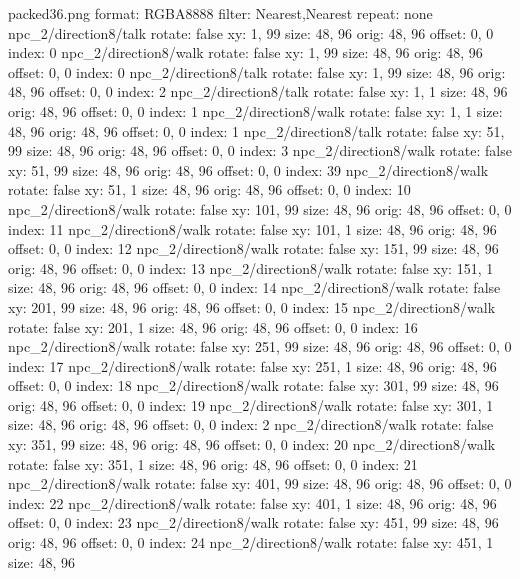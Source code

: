 packed36.png
format: RGBA8888
filter: Nearest,Nearest
repeat: none
npc_2/direction8/talk
  rotate: false
  xy: 1, 99
  size: 48, 96
  orig: 48, 96
  offset: 0, 0
  index: 0
npc_2/direction8/walk
  rotate: false
  xy: 1, 99
  size: 48, 96
  orig: 48, 96
  offset: 0, 0
  index: 0
npc_2/direction8/talk
  rotate: false
  xy: 1, 99
  size: 48, 96
  orig: 48, 96
  offset: 0, 0
  index: 2
npc_2/direction8/talk
  rotate: false
  xy: 1, 1
  size: 48, 96
  orig: 48, 96
  offset: 0, 0
  index: 1
npc_2/direction8/walk
  rotate: false
  xy: 1, 1
  size: 48, 96
  orig: 48, 96
  offset: 0, 0
  index: 1
npc_2/direction8/talk
  rotate: false
  xy: 51, 99
  size: 48, 96
  orig: 48, 96
  offset: 0, 0
  index: 3
npc_2/direction8/walk
  rotate: false
  xy: 51, 99
  size: 48, 96
  orig: 48, 96
  offset: 0, 0
  index: 39
npc_2/direction8/walk
  rotate: false
  xy: 51, 1
  size: 48, 96
  orig: 48, 96
  offset: 0, 0
  index: 10
npc_2/direction8/walk
  rotate: false
  xy: 101, 99
  size: 48, 96
  orig: 48, 96
  offset: 0, 0
  index: 11
npc_2/direction8/walk
  rotate: false
  xy: 101, 1
  size: 48, 96
  orig: 48, 96
  offset: 0, 0
  index: 12
npc_2/direction8/walk
  rotate: false
  xy: 151, 99
  size: 48, 96
  orig: 48, 96
  offset: 0, 0
  index: 13
npc_2/direction8/walk
  rotate: false
  xy: 151, 1
  size: 48, 96
  orig: 48, 96
  offset: 0, 0
  index: 14
npc_2/direction8/walk
  rotate: false
  xy: 201, 99
  size: 48, 96
  orig: 48, 96
  offset: 0, 0
  index: 15
npc_2/direction8/walk
  rotate: false
  xy: 201, 1
  size: 48, 96
  orig: 48, 96
  offset: 0, 0
  index: 16
npc_2/direction8/walk
  rotate: false
  xy: 251, 99
  size: 48, 96
  orig: 48, 96
  offset: 0, 0
  index: 17
npc_2/direction8/walk
  rotate: false
  xy: 251, 1
  size: 48, 96
  orig: 48, 96
  offset: 0, 0
  index: 18
npc_2/direction8/walk
  rotate: false
  xy: 301, 99
  size: 48, 96
  orig: 48, 96
  offset: 0, 0
  index: 19
npc_2/direction8/walk
  rotate: false
  xy: 301, 1
  size: 48, 96
  orig: 48, 96
  offset: 0, 0
  index: 2
npc_2/direction8/walk
  rotate: false
  xy: 351, 99
  size: 48, 96
  orig: 48, 96
  offset: 0, 0
  index: 20
npc_2/direction8/walk
  rotate: false
  xy: 351, 1
  size: 48, 96
  orig: 48, 96
  offset: 0, 0
  index: 21
npc_2/direction8/walk
  rotate: false
  xy: 401, 99
  size: 48, 96
  orig: 48, 96
  offset: 0, 0
  index: 22
npc_2/direction8/walk
  rotate: false
  xy: 401, 1
  size: 48, 96
  orig: 48, 96
  offset: 0, 0
  index: 23
npc_2/direction8/walk
  rotate: false
  xy: 451, 99
  size: 48, 96
  orig: 48, 96
  offset: 0, 0
  index: 24
npc_2/direction8/walk
  rotate: false
  xy: 451, 1
  size: 48, 96

